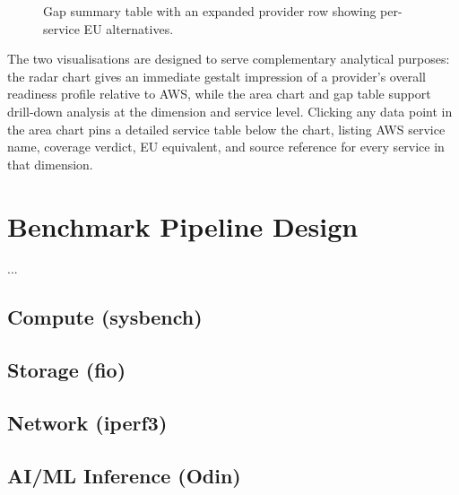 \begin{figure}[htbp]
  \centering
  \caption{Gap summary table with an expanded provider row showing per-service EU alternatives.}
  \label{fig:readiness_gap_table}
\end{figure}

The two visualisations are designed to serve complementary analytical purposes: the radar chart gives an immediate gestalt impression of a provider's overall readiness profile relative to AWS, while the area chart and gap table support drill-down analysis at the dimension and service level. Clicking any data point in the area chart pins a detailed service table below the chart, listing AWS service name, coverage verdict, EU equivalent, and source reference for every service in that dimension.


\section{Benchmark Pipeline Design}
\label{sec:benchmark_methodology}

...

\subsection{Compute (sysbench)}
\subsection{Storage (fio)}
\subsection{Network (iperf3)}
\subsection{AI/ML Inference (Odin)}



